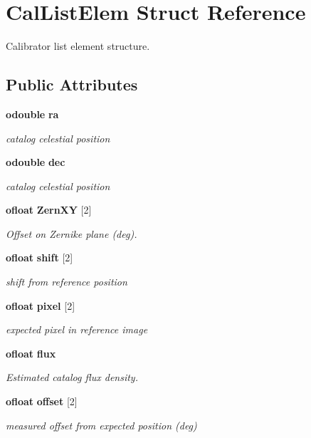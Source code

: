 \section{Cal\-List\-Elem Struct Reference}
\label{structCalListElem}
Calibrator list element structure.  


\subsection*{Public Attributes}
\begin{CompactItemize}
\item 
{\bf odouble} {\bf ra}
\begin{CompactList}\small\item\em catalog celestial position \item\end{CompactList}\item 
{\bf odouble} {\bf dec}
\begin{CompactList}\small\item\em catalog celestial position \item\end{CompactList}\item 
{\bf ofloat} {\bf Zern\-XY} [2]
\begin{CompactList}\small\item\em Offset on Zernike plane (deg). \item\end{CompactList}\item 
{\bf ofloat} {\bf shift} [2]
\begin{CompactList}\small\item\em shift from reference position \item\end{CompactList}\item 
{\bf ofloat} {\bf pixel} [2]
\begin{CompactList}\small\item\em expected pixel in reference image \item\end{CompactList}\item 
{\bf ofloat} {\bf flux}
\begin{CompactList}\small\item\em Estimated catalog flux density. \item\end{CompactList}\item 
{\bf ofloat} {\bf offset} [2]
\begin{CompactList}\small\item\em measured offset from expected position (deg) \item\end{CompactList}\item 

\end{CompactItemize}
